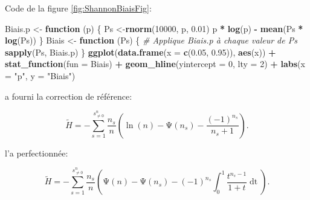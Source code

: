 \documentclass[
  11pt,
  french,
  a4paper,
  extrafontsizes,onecolumn,openright
  ]{memoir}
\newenvironment{Shaded}{\begin{snugshade}}{\end{snugshade}}
\newcommand{\CommentTok}[1]{\textcolor[rgb]{0.56,0.35,0.01}{\textit{#1}}}
\newcommand{\ControlFlowTok}[1]{\textcolor[rgb]{0.13,0.29,0.53}{\textbf{#1}}}
\newcommand{\DataTypeTok}[1]{\textcolor[rgb]{0.13,0.29,0.53}{#1}}
\newcommand{\DecValTok}[1]{\textcolor[rgb]{0.00,0.00,0.81}{#1}}
\newcommand{\FloatTok}[1]{\textcolor[rgb]{0.00,0.00,0.81}{#1}}
\newcommand{\KeywordTok}[1]{\textcolor[rgb]{0.13,0.29,0.53}{\textbf{#1}}}
\newcommand{\NormalTok}[1]{#1}
\newcommand{\OperatorTok}[1]{\textcolor[rgb]{0.81,0.36,0.00}{\textbf{#1}}}
\newcommand{\StringTok}[1]{\textcolor[rgb]{0.31,0.60,0.02}{#1}}
\newlength{\rf}
\begin{document}
\normalsize

Code de la figure \ref{fig:ShannonBiaisFig}:

\scriptsize

\begin{Shaded}
\begin{Highlighting}[]
\NormalTok{Biais.p <-}\StringTok{ }\ControlFlowTok{function}\NormalTok{ (p) \{}
\NormalTok{    Ps <-}\KeywordTok{rnorm}\NormalTok{(}\DecValTok{10000}\NormalTok{, p, }\FloatTok{0.01}\NormalTok{)}
\NormalTok{    p }\OperatorTok{*}\StringTok{ }\KeywordTok{log}\NormalTok{(p) }\OperatorTok{-}\StringTok{ }\KeywordTok{mean}\NormalTok{(Ps }\OperatorTok{*}\StringTok{ }\KeywordTok{log}\NormalTok{(Ps))}
\NormalTok{  \}}
\NormalTok{  Biais <-}\StringTok{ }\ControlFlowTok{function}\NormalTok{ (Ps) \{}
    \CommentTok{# Applique Biais.p à chaque valeur de Ps}
    \KeywordTok{sapply}\NormalTok{(Ps, Biais.p)}
\NormalTok{  \}}
  \KeywordTok{ggplot}\NormalTok{(}\KeywordTok{data.frame}\NormalTok{(}\DataTypeTok{x =} \KeywordTok{c}\NormalTok{(}\FloatTok{0.05}\NormalTok{, }\FloatTok{0.95}\NormalTok{)), }\KeywordTok{aes}\NormalTok{(x)) }\OperatorTok{+}\StringTok{ }
\StringTok{    }\KeywordTok{stat_function}\NormalTok{(}\DataTypeTok{fun =}\NormalTok{ Biais) }\OperatorTok{+}
\StringTok{    }\KeywordTok{geom_hline}\NormalTok{(}\DataTypeTok{yintercept =} \DecValTok{0}\NormalTok{, }\DataTypeTok{lty =} \DecValTok{2}\NormalTok{) }\OperatorTok{+}
\StringTok{    }\KeywordTok{labs}\NormalTok{(}\DataTypeTok{x =} \StringTok{"p"}\NormalTok{, }\DataTypeTok{y =} \StringTok{"Biais"}\NormalTok{)}
\end{Highlighting}
\end{Shaded}

\normalsize

\textcite{Grassberger1988} a fourni la correction de référence:

\begin{equation}
  \label{eq:Grassberger1988}
  \tilde{H}
  = -\sum^{s^{n}_{\ne 0}}_{s=1}
  {\frac{n_s}{n}\left(\ln\left(n\right)-\mathrm{\Psi}\left(n_s\right)-\frac{{\left(-1\right)}^{n_s}}{n_s+1}\right)}.
\end{equation}

\textcite{Grassberger2003} l'a perfectionnée:

\begin{equation}
  \label{eq:Grassberger2003}
  \tilde{H} 
  = -\sum^{s^{n}_{\ne 0}}_{s=1}
    {\frac{n_s}{n} \left(\mathrm{\Psi}\left(n\right)-\mathrm{\Psi}\left(n_s\right)-{\left(-1\right)}^{n_s}\int^1_0{\frac{t^{n_s-1}}{1+t}\mathop{dt}}\right)}.
\end{equation}
\end{document}

